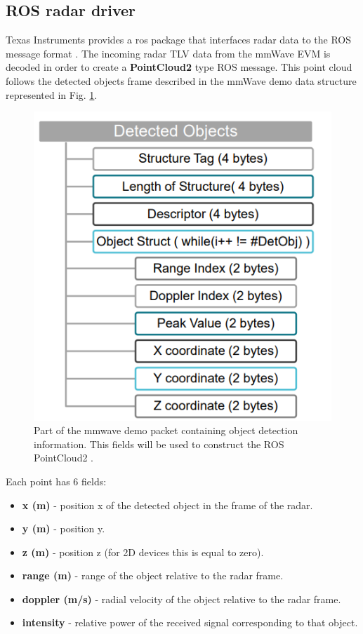 \subsection{ROS radar driver}
Texas Instruments provides a ros package that interfaces radar data to the ROS message format \cite{tisetup}. The incoming radar TLV data from the mmWave EVM is decoded in order to create a  \textbf{PointCloud2} type ROS message.
This point cloud follows the detected objects frame described in the mmWave demo data structure \cite{mmdata} represented in Fig. \ref{fig:demodata}.
\begin{figure}[!htb]
    \centering
    \includegraphics[scale=0.8]{imgs/chapter4/demodata.png}
    \caption{Part of the mmwave demo packet containing object detection information. This fields will be used to construct the ROS PointCloud2 \cite{mmdata}.}
    \label{fig:demodata}
\end{figure}
Each point has 6 fields:
\begin{itemize}
\item \textbf{x (m)} - position x of the detected  object in the frame of the radar.
\item \textbf{y (m)} - position y.
\item \textbf{z (m)} - position z (for 2D devices this is equal to zero).
\item \textbf{range (m)} - range of the object relative to the radar frame.
\item \textbf{doppler (m/s)} - radial velocity of the object relative to the radar frame.
\item \textbf{intensity} - relative power of the received signal corresponding to that object.
\end{itemize}
